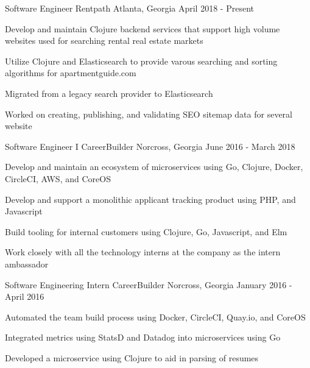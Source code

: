 

\begin{cventries}

  \cventry
    {Software Engineer} %
    {Rentpath} %
    {Atlanta, Georgia} %
    {April 2018 - Present} %
    {
      \begin{cvitems} %
        \item{Develop and maintain Clojure backend services that support high volume websites used for searching rental real estate markets}
        \item{Utilize Clojure and Elasticsearch to provide varous searching and sorting algorithms for apartmentguide.com}
        \item{Migrated from a legacy search provider to Elasticsearch}
        \item{Worked on creating, publishing, and validating SEO sitemap data for several website} 
      \end{cvitems} 
    }

  \cventry
    {Software Engineer I} %
    {CareerBuilder} %
    {Norcross, Georgia} %
    {June 2016 - March 2018} %
    {
      \begin{cvitems} %
        \item {Develop and maintain an ecosystem of microservices using Go, Clojure, Docker, CircleCI, AWS, and CoreOS}
        \item{Develop and support a monolithic applicant tracking product using PHP, and Javascript}
        \item{Build tooling for internal customers using Clojure, Go, Javascript, and Elm}
        \item {Work closely with all the technology interns at the company as the intern ambassador} 
      \end{cvitems} 
    }


  \cventry
    {Software Engineering Intern} %
    {CareerBuilder} %
    {Norcross, Georgia} %
    {January 2016 - April 2016} %
    {
      \begin{cvitems} %
        \item {Automated the team build process using Docker, CircleCI, Quay.io, and CoreOS}
        \item {Integrated metrics using StatsD and Datadog into microservices using Go}
        \item {Developed a microservice using Clojure to aid in parsing of resumes}
      \end{cvitems}
    }


\end{cventries}
